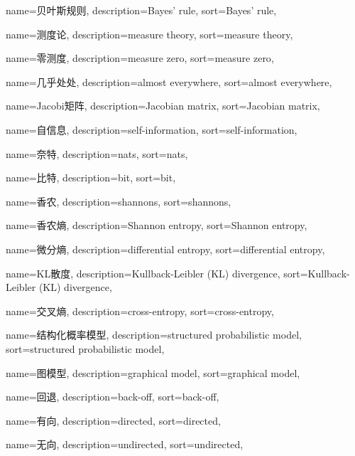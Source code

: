 {
  name=贝叶斯规则,
  description={Bayes' rule},
  sort={Bayes' rule},
}

{
  name=测度论,
  description={measure theory},
  sort={measure theory},
}

{
  name=零测度,
  description={measure zero},
  sort={measure zero},
}

{
  name=几乎处处,
  description={almost everywhere},
  sort={almost everywhere},
}

{
  name=Jacobi矩阵,
  description={Jacobian matrix},
  sort={Jacobian matrix},
}

{
  name=自信息,
  description={self-information},
  sort={self-information},
}

{
  name=奈特,
  description={nats},
  sort={nats},
}

{
  name=比特,
  description={bit},
  sort={bit},
}

{
  name=香农,
  description={shannons},
  sort={shannons},
}

{
  name=香农熵,
  description={Shannon entropy},
  sort={Shannon entropy},
}

{
  name=微分熵,
  description={differential entropy},
  sort={differential entropy},
}

{
  name=KL散度,
  description={Kullback-Leibler (KL) divergence},
  sort={Kullback-Leibler (KL) divergence},
}

{
  name=交叉熵,
  description={cross-entropy},
  sort={cross-entropy},
}

{
  name=结构化概率模型,
  description={structured probabilistic model},
  sort={structured probabilistic model},
}

{
  name=图模型,
  description={graphical model},
  sort={graphical model},
}

{
  name=回退,
  description={back-off},
  sort={back-off},
}

{
  name=有向,
  description={directed},
  sort={directed},
}

{
  name=无向,
  description={undirected},
  sort={undirected},
}

